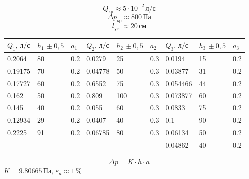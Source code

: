 \[Q_\text{кр}\approx 5\cdot 10^{-2}\,\text{л}/\text{с}\]
\[\Delta p_\text{кр}\approx 800\,\text{Па}\]
\[l_\text{уст}\approx 20\,\text{см}\]

\begin{table}[!ht]
    \centering
    \begin{tabular}{|l|l|l||l|l|l||l|l|l|}
    \hline
        $Q_1,\,\text{л}/\text{с}$ & $h_1\,\pm 0{,}5$ & $a_1$ & $Q_2,\,\text{л}/\text{с}$ & $h_2\,\pm 0{,}5$ & $a_2$ & $Q_3,\,\text{л}/\text{с}$ & $h_3\,\pm 0{,}5$ & $a_3$ \\ \hline
        0.2064 & 80 & 0.2 & 0.0279 & 25 & 0.3 & 0.0194 & 15 & 0.2 \\ \hline
        0.19175 & 70 & 0.2 & 0.04778 & 50 & 0.3 & 0.03877 & 31 & 0.2 \\ \hline
        0.17727 & 60 & 0.2 & 0.6552 & 75 & 0.3 & 0.054466 & 44 & 0.2 \\ \hline
        0.162 & 50 & 0.2 & 0.809 & 100 & 0.3 & 0.073877 & 60 & 0.2 \\ \hline
        0.145 & 40 & 0.2 & 0.055 & 60 & 0.3 & 0.0833 & 75 & 0.2 \\ \hline
        0.12934 & 29 & 0.2 & 0.0407 & 40 & 0.3 & 0.1 & 90 & 0.2 \\ \hline
        0.2225 & 91 & 0.2 & 0.06785 & 80 & 0.3 & 0.06134 & 50 & 0.2 \\ \hline
        & & & & & & 0.04862 & 40 & 0.2 \\ \hline
    \end{tabular}
\end{table}

\[\Delta p = K \cdot h \cdot a\]
$K=9.80665\,\text{Па}$, $\varepsilon_a \approx 1\,\%$

